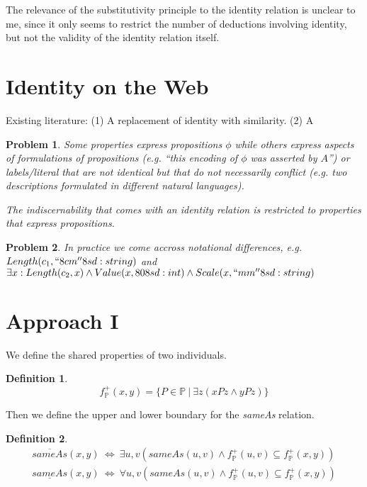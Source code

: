 \documentclass[11pt,a4paper,notitlepage,onecolumn,twoside]{article}
\newtheorem{definition}{Definition}
\newtheorem{problem}{Problem}
\begin{document}
The relevance of the substitutivity principle to the identity relation
is unclear to me, since it only seems to restrict the number of deductions
involving identity, but not the validity of the identity relation itself.

\section{Identity on the Web}

Existing literature:
(1) A replacement of identity with similarity.
(2) A 

\begin{problem}
Some properties express propositions $\phi$
while others express aspects of formulations of propositions
(e.g. ``this encoding of $\phi$ was asserted by $A$'')
or labels/literal that are not identical but that do not necessarily
conflict (e.g. two descriptions formulated in different natural languages).

The indiscernability that comes with an identity relation is restricted to
properties that express propositions.
\end{problem}

\begin{problem}
In practice we come accross notational differences,
e.g. $Length(c_1, ``8cm''^^xsd:string)$ and
$\exists x: Length(c_2,x) \land Value(x, 80^^xsd:int) \land Scale(x, ``mm''^^xsd:string)$
\end{problem}

\section{Approach I}

We define the shared properties of two individuals.

\begin{definition}
\begin{equation}
f^{+}_{\mathbb{P}}(x,y) = \{ P \in \mathbb{P} \  \vert \  \exists z (xPz \land yPz) \}
\end{equation}
\end{definition}

Then we define the upper and lower boundary for the \emph{sameAs} relation.

\begin{definition}
\begin{align}
\overline{sameAs}(x,y) \  \iff \  \exists u,v (sameAs(u,v) \land
    f^{+}_{\mathbb{P}}(u,v) \subseteq f^{+}_{\mathbb{P}}(x,y)) \\
\underline{sameAs}(x,y) \  \iff \  \forall u,v (sameAs(u,v) \land
    f^{+}_{\mathbb{P}}(u,v) \subseteq f^{+}_{\mathbb{P}}(x,y))
\end{align}
\end{definition}
\end{document}
